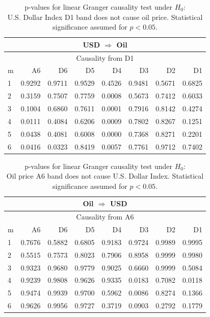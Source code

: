 %
%
\begin{table}[H]
\begin{center}
\begin{tabular}{l|r r r r r r r}
\hline\hline
\multicolumn{8}{c}{USD $\Rightarrow$ Oil}\\
\hline
\multicolumn{8}{c}{Causality from D1}\\
\hline\hline
m & A6 & D6 & D5 & D4 & D3 & D2 & D1 \\
\hline
1 & 0.9292 & 0.9711 & 0.9529 & 0.4526 & 0.9481 & 0.5671 & 0.6825 \\
2 & 0.3159 & 0.7507 & 0.7759 & \cellcolor{mygreen}0.0008 & 0.5673 & 0.7412 & 0.6033 \\
3 & 0.1004 & 0.6860 & 0.7611 & \cellcolor{mygreen}0.0001 & 0.7916 & 0.8142 & 0.4274 \\
4 & \cellcolor{mygreen}0.0111 & 0.4084 & 0.6206 & \cellcolor{mygreen}0.0009 & 0.7802 & 0.8267 & 0.1251 \\
5 & \cellcolor{mygreen}0.0438 & 0.4081 & 0.6008 & \cellcolor{mygreen}0.0000 & 0.7368 & 0.8271 & 0.2201 \\
6 & \cellcolor{mygreen}0.0416 & \cellcolor{mygreen}0.0323 & 0.8419 & \cellcolor{mygreen}0.0057 & 0.7761 & 0.9712 & 0.7402 \\
\hline\hline
\end{tabular}
\caption{p-values for linear Granger causality test under $H_0$:\\
U.S. Dollar Index D1 band does not cause oil price. Statistical significance assumed for $p<0.05$.}
\end{center}
\end{table}

%
%
\begin{table}[H]
\begin{center}
\begin{tabular}{l|r r r r r r r}
\hline\hline
\multicolumn{8}{c}{Oil $\Rightarrow$ USD}\\
\hline
\multicolumn{8}{c}{Causality from A6}\\
\hline\hline
m & A6 & D6 & D5 & D4 & D3 & D2 & D1 \\
\hline
1 & 0.7676 & 0.5882 & 0.6805 & 0.9183 & 0.9724 & 0.9989 & 0.9995 \\
2 & 0.5515 & 0.7573 & 0.8023 & 0.7906 & 0.8958 & 0.9999 & 0.9980 \\
3 & 0.9323 & 0.9680 & 0.9779 & 0.9025 & 0.6660 & 0.9999 & 0.5084 \\
4 & 0.9239 & 0.9808 & 0.9626 & 0.9335 & \cellcolor{mygreen}0.0183 & 0.7082 & \cellcolor{mygreen}0.0118 \\
5 & 0.9474 & 0.9939 & 0.9700 & 0.5962 & \cellcolor{mygreen}0.0086 & 0.8274 & 0.1366 \\
6 & 0.9626 & 0.9956 & 0.9727 & 0.3719 & 0.0903 & 0.2792 & 0.1779 \\
\hline\hline
\end{tabular}
\caption{p-values for linear Granger causality test under $H_0$:\\
Oil price A6 band does not cause U.S. Dollar Index. Statistical significance assumed for $p<0.05$.}
\end{center}
\end{table}

